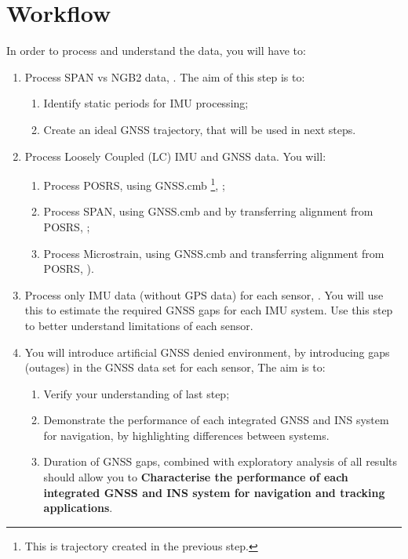 \documentclass[11pt,fleqn]{book} %
\begin{document}
\section{Workflow}

In order to process and understand the data, you will have to:

\begin{enumerate}
	\item Process SPAN vs NGB2 data, . The aim of this step is to: 
	\begin{enumerate}
		\item Identify static periods for IMU processing;
		\item Create an ideal GNSS trajectory, that will be used in next steps.
	\end{enumerate}
	\item Process Loosely Coupled (LC) IMU and GNSS data. You will:
	\begin{enumerate}
		\item Process POSRS, using GNSS.cmb \footnote{This is trajectory created in the previous step.}, ;
		\item Process SPAN, using GNSS.cmb and by transferring alignment from POSRS, ;
		\item Process Microstrain, using GNSS.cmb and transferring alignment from POSRS, ).
	\end{enumerate}
	\item Process only IMU data (without GPS data) for each sensor, . You will use this to estimate the required GNSS gaps for each IMU system. Use this step to better understand limitations of each sensor. 
	\item You will introduce artificial GNSS denied environment, by introducing gaps (outages) in the GNSS data set for each sensor,  The aim is to: 
	\begin{enumerate}
	\item Verify your understanding of last step;
	\item Demonstrate the performance of each integrated GNSS and INS system for navigation, by highlighting differences between systems.
	\item Duration of GNSS gaps, combined with exploratory analysis of all results should allow you to \textbf{Characterise the performance of each integrated GNSS and INS system for navigation and tracking applications}.

\end{enumerate}
\end{enumerate}
\end{document}
